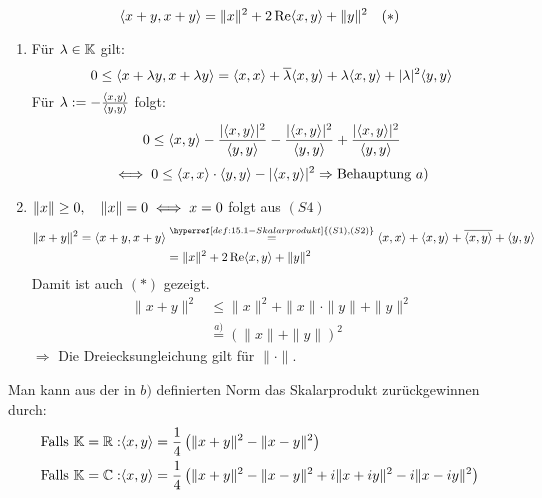 \begin{bemerkung*}
	\[ \langle x + y, x + y \rangle = \| x\|^{2} + 2 \mathop{\rm Re}\nolimits \langle x, y \rangle + \| y \|^{2} \quad (*) \label{eq:15.2-*} \]
\end{bemerkung*}

\begin{beweis}
	\begin{enumerate}[label=\alph*\upshape)]
		\item Für $\lambda \in \mathbb{K}$ gilt:
			\[ 0 \leq \langle x + \lambda y, x + \lambda y \rangle = \langle x, x \rangle + \overline{\lambda} \langle x, y \rangle + \lambda \langle x, y \rangle + |\lambda|^{2} \langle y, y \rangle \]
			Für $\lambda := - \frac{\langle x, y \rangle}{\langle y, y \rangle}$ folgt:
			\[ 0 \leq \langle x, y \rangle - \frac{|\langle x,y \rangle|^{2}}{\langle y, y \rangle} - \frac{|\langle x, y \rangle|^{2}}{\langle y, y \rangle} + \frac{|\langle x, y \rangle|^{2}}{\langle y, y \rangle} \]
			\[ \iff 0 \leq \langle x, x \rangle \cdot \langle y, y \rangle - |\langle x, y \rangle|^{2} \Rightarrow \text{Behauptung } a) \]
		\item $\| x \| \geq 0, \quad \| x \| = 0 \iff x = 0$ folgt aus \hyperref[def:15.1iv]{$(S4)$} \\
			\begin{align*}
				\| x + y \|^{2} = \< x + y, x + y \> & \overset{\hyperref[def:15.1-Skalarprodukt]{(S1), (S2)}}{=} \< x, x \> + \< x, y \> + \overline{\< x, y \>} + \< y, y \> \\
						& = \| x \|^{2} + 2 \Re \< x, y \> + \| y \|^{2}
			\end{align*}
			Damit ist auch \hyperref[eq:15.2-*]{$(*)$} gezeigt.
			\begin{align*}
				\| x + y \|^{2} & \leq \| x \|^{2} + \| x \| \cdot \| y \| + \| y \|^{2} \\
						& \overset{\hyperref[prop:15.2a]{a)}}{=} \left( \| x \| + \| y \| \right)^{2}
			\end{align*}
			$\Rightarrow$ Die Dreiecksungleichung gilt für $\| \cdot \|$.
	\end{enumerate}	
\end{beweis}


\begin{bemerkung} \label{bem:15.3}
	Man kann aus der in \hyperref[prop:15.2b]{$b)$} definierten Norm das Skalarprodukt zurückgewinnen durch:
	\begin{align*}
		\text{Falls } \mathbb{K} = \mathbb{R}: &  \langle x, y \rangle = \frac{1}{4} \left( \| x + y \|^{2} - \| x - y \|^{2} \right) \\
		\text{Falls } \mathbb{K} = \mathbb{C}: &  \langle x, y \rangle = \frac{1}{4} \left( \| x + y \|^{2} - \| x - y \|^{2} + i \| x + i y\|^{2} - i \| x - iy\|^{2} \right)
	\end{align*}
\end{bemerkung}



